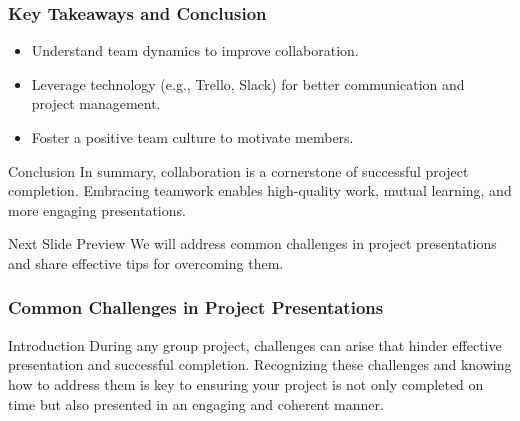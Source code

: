 \documentclass[aspectratio=169]{beamer}
\begin{document}
\begin{frame}[fragile]
    \frametitle{Key Takeaways and Conclusion}
    \begin{itemize}
        \item Understand team dynamics to improve collaboration.
        \item Leverage technology (e.g., Trello, Slack) for better communication and project management.
        \item Foster a positive team culture to motivate members.
    \end{itemize}
    
    \begin{block}{Conclusion}
        In summary, collaboration is a cornerstone of successful project completion. Embracing teamwork enables high-quality work, mutual learning, and more engaging presentations.
    \end{block}
    
    \begin{block}{Next Slide Preview}
        We will address common challenges in project presentations and share effective tips for overcoming them.
    \end{block}
\end{frame}

\begin{frame}[fragile]
  \frametitle{Common Challenges in Project Presentations}
  \begin{block}{Introduction}
    During any group project, challenges can arise that hinder effective presentation and successful completion. Recognizing these challenges and knowing how to address them is key to ensuring your project is not only completed on time but also presented in an engaging and coherent manner.
  \end{block}
\end{frame}
\end{document}
